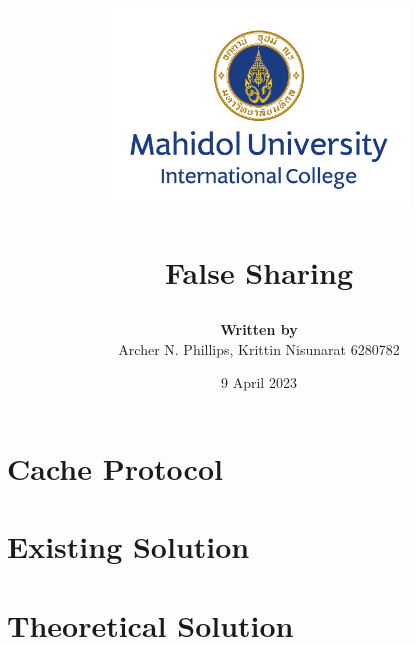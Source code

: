 \documentclass[a4paper, 12pt]{report}
\title{

	{\includegraphics[width=80mm,scale=0.5]{MUIC_Logo_Eng_Center.png}} \\
	{\textbf{\mySubject}}\\
	{\large False Sharing}\\
}
\author{
	{\textbf{Written by}} \\ 
	{Archer N. Phillips, Krittin Nisunarat 6280782} \\
}
\date{9 April 2023}
\begin{document}
\maketitle
\tableofcontents

\chapter{Cache Protocol}


\chapter{Existing Solution}



\chapter{Theoretical Solution}



\end{document}
